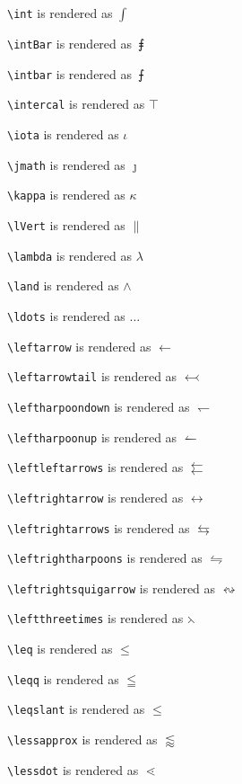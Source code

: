 \texttt{\textbackslash int} is rendered as $\int$

\texttt{\textbackslash intBar} is rendered as $\intBar$

\texttt{\textbackslash intbar} is rendered as $\intbar$

\texttt{\textbackslash intercal} is rendered as $\intercal$

\texttt{\textbackslash iota} is rendered as $\iota$

\texttt{\textbackslash jmath} is rendered as $\jmath$

\texttt{\textbackslash kappa} is rendered as $\kappa$

\texttt{\textbackslash lVert} is rendered as $\lVert$

\texttt{\textbackslash lambda} is rendered as $\lambda$

\texttt{\textbackslash land} is rendered as $\land$

\texttt{\textbackslash ldots} is rendered as $\ldots$

\texttt{\textbackslash leftarrow} is rendered as $\leftarrow$

\texttt{\textbackslash leftarrowtail} is rendered as $\leftarrowtail$

\texttt{\textbackslash leftharpoondown} is rendered as $\leftharpoondown$

\texttt{\textbackslash leftharpoonup} is rendered as $\leftharpoonup$

\texttt{\textbackslash leftleftarrows} is rendered as $\leftleftarrows$

\texttt{\textbackslash leftrightarrow} is rendered as $\leftrightarrow$

\texttt{\textbackslash leftrightarrows} is rendered as $\leftrightarrows$

\texttt{\textbackslash leftrightharpoons} is rendered as $\leftrightharpoons$

\texttt{\textbackslash leftrightsquigarrow} is rendered as $\leftrightsquigarrow$

\texttt{\textbackslash leftthreetimes} is rendered as $\leftthreetimes$

\texttt{\textbackslash leq} is rendered as $\leq$

\texttt{\textbackslash leqq} is rendered as $\leqq$

\texttt{\textbackslash leqslant} is rendered as $\leqslant$

\texttt{\textbackslash lessapprox} is rendered as $\lessapprox$

\texttt{\textbackslash lessdot} is rendered as $\lessdot$

